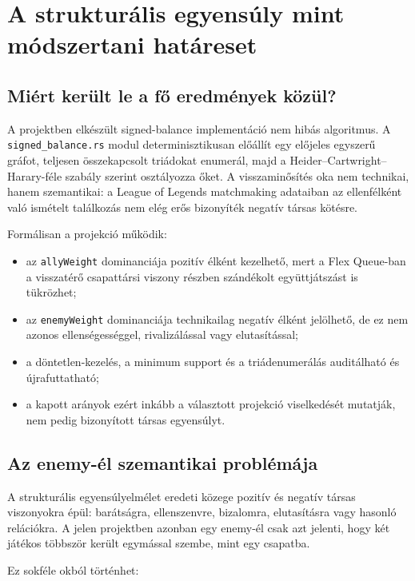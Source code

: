 \chapter{A strukturális egyensúly mint módszertani határeset}

\section{Miért került le a fő eredmények közül?}

A projektben elkészült signed-balance implementáció nem hibás algoritmus. A \texttt{signed\_balance.rs} modul determinisztikusan előállít egy előjeles egyszerű gráfot, teljesen összekapcsolt triádokat enumerál, majd a Heider--Cartwright--Harary-féle szabály szerint osztályozza őket. A visszaminősítés oka nem technikai, hanem szemantikai: a League of Legends matchmaking adataiban az ellenfélként való ismételt találkozás nem elég erős bizonyíték negatív társas kötésre.

Formálisan a projekció működik:

\begin{itemize}
    \item az \texttt{allyWeight} dominanciája pozitív élként kezelhető, mert a Flex Queue-ban a visszatérő csapattársi viszony részben szándékolt együttjátszást is tükrözhet;
    \item az \texttt{enemyWeight} dominanciája technikailag negatív élként jelölhető, de ez nem azonos ellenségességgel, rivalizálással vagy elutasítással;
    \item a döntetlen-kezelés, a minimum support és a triádenumerálás auditálható és újrafuttatható;
    \item a kapott arányok ezért inkább a választott projekció viselkedését mutatják, nem pedig bizonyított társas egyensúlyt.
\end{itemize}

\section{Az enemy-él szemantikai problémája}

A strukturális egyensúlyelmélet eredeti közege pozitív és negatív társas viszonyokra épül: barátságra, ellenszenvre, bizalomra, elutasításra vagy hasonló relációkra. A jelen projektben azonban egy enemy-él csak azt jelenti, hogy két játékos többször került egymással szembe, mint egy csapatba.

Ez sokféle okból történhet:

